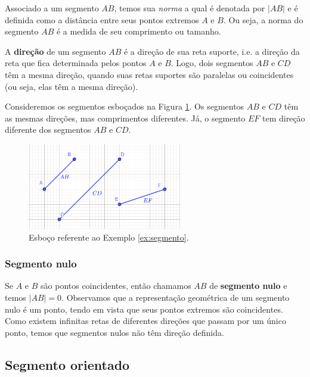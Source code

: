 Associado a um segmento $AB$, temos sua \emph{norma} a qual é denotada por $|AB|$ e é definida como a distância entre seus pontos extremos $A$ e $B$. Ou seja, a norma do segmento $AB$ é a medida de seu comprimento ou tamanho.

A {\bf direção} de um segmento $AB$ é a direção de sua reta suporte, i.e. a direção da reta que fica determinada pelos pontos $A$ e $B$. Logo, dois segmentos $AB$ e $CD$ têm a mesma direção, quando suas retas suportes são paralelas ou coincidentes (ou seja, elas têm a mesma direção).

\begin{ex}\label{ex:segmento}
  Consideremos os segmentos esboçados na Figura \ref{fig:ex_segmento}. Os segmentos $AB$ e $CD$ têm as mesmas direções, mas comprimentos diferentes. Já, o segmento $EF$ tem direção diferente dos segmentos $AB$ e $CD$.
  
  \begin{figure}[H]
    \centering
    \includegraphics[width=0.6\textwidth]{./cap_vetor/dados/fig_ex_segmento/fig_ex_segmento}
  \caption{Esboço referente ao Exemplo \ref{ex:segmento}.}
  \label{fig:ex_segmento}
\end{figure}
\end{ex}

\subsubsection{Segmento nulo}

Se $A$ e $B$ são pontos coincidentes, então chamamos $AB$ de {\bf segmento nulo} e temos $|AB| = 0$. Observamos que a representação geométrica de um segmento nulo é um ponto, tendo em vista que seus pontos extremos são coincidentes. Como existem infinitas retas de diferentes direções que passam por um único ponto, temos que segmentos nulos não têm direção definida.

\subsection{Segmento orientado}

